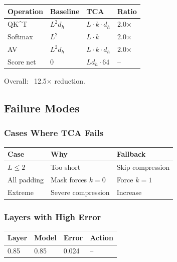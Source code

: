 \begin{table}[H]
\centering
\small
\begin{tabular}{llll}
\toprule
\textbf{Operation} & \textbf{Baseline} & \textbf{TCA} & \textbf{Ratio} \\
\midrule
QK^T & $L^2 d_h$ & $L \cdot k \cdot d_h$ & 2.0$\times$ \\
Softmax & $L^2$ & $L \cdot k$ & 2.0$\times$ \\
AV & $L^2 d_h$ & $L \cdot k \cdot d_h$ & 2.0$\times$ \\
Score net & 0 & $L d_h \cdot 64$ & -- \\
\bottomrule
\end{tabular}
\end{table}

Overall: ~12.5$\times$ reduction.

\subsection{Failure Modes}

\subsubsection{Cases Where TCA Fails}

\begin{table}[H]
\centering
\small
\begin{tabular}{lll}
\toprule
\textbf{Case} & \textbf{Why} & \textbf{Fallback} \\
\midrule
$L \leq 2$ & Too short & Skip compression \\
All padding & Mask forces $k=0$ & Force $k=1$ \\
Extreme & Severe compression & Increase \\
\bottomrule
\end{tabular}
\end{table}

\subsubsection{Layers with High Error}

\begin{table}[H]
\centering
\small
\begin{tabular}{llll}
\toprule
\textbf{Layer} & \textbf{Model} & \textbf{Error} & \textbf{Action} \\
\midrule
0.85 & 0.85 & 0.024 & -- \\
\bottomrule
\end{tabular}
\end{table}

